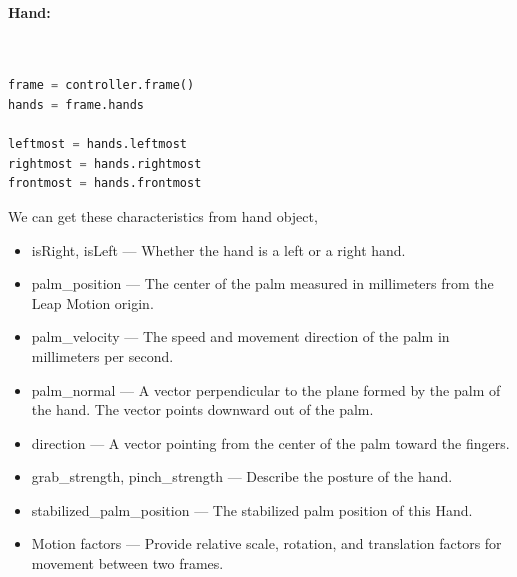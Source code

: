 \documentclass[11pt,a4paper]{article}
\newcommand\tab[1][1cm]{\hspace*{#1}}
\begin{document}
    \tab{In on\_frame method from controller object, we can get the current frame. It also supports serialization.}\\

    \vspace{3cm}
    \textbf{\Large{Hand:}}
	\vspace{0.5cm}\\
	\tab{Hands are the main entity tracked by the Leap Motion controller. The Hand class represents a physical hand detected by the Leap. A Hand object provides access to lists of its pointables as well as attributes describing the hand position, orientation, and movement.}\\
	\tab{From current frame object, we can get the current set of detected hand as an array. We can get hand from hands object by these properties,}\\
	\begin{lstlisting}[language=Python, caption=getting frame and hand object]
frame = controller.frame() 
hands = frame.hands

leftmost = hands.leftmost
rightmost = hands.rightmost
frontmost = hands.frontmost\end{lstlisting}
\vspace{0.5cm}
    We can get these characteristics from hand object,
    \begin{itemize}
        \item isRight, isLeft — Whether the hand is a left or a right hand.
        \item palm\_position — The center of the palm measured in millimeters from the Leap Motion origin.
        \item palm\_velocity — The speed and movement direction of the palm in millimeters per second.
        \item palm\_normal — A vector perpendicular to the plane formed by the palm of the hand. The vector points downward out of the palm.
        \item direction — A vector pointing from the center of the palm toward the fingers.
        \item grab\_strength, pinch\_strength — Describe the posture of the hand.
        \item stabilized\_palm\_position — The stabilized palm position of this Hand.
        \item Motion factors — Provide relative scale, rotation, and translation factors for movement between two frames.
    \end{itemize}
    \vspace{.5cm}
\end{document}

